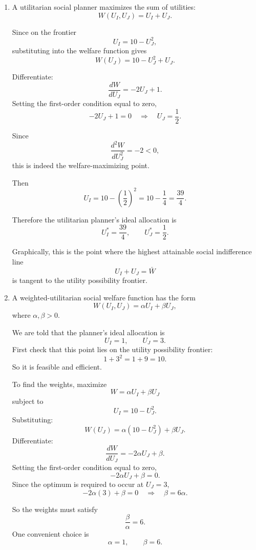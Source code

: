 \documentclass[12pt]{article}
\begin{document}
\begin{enumerate}[label=(\alph*)]
    The feasible utility set is the region on and below this frontier:
    \[
    U_I + U_J^2 \le 10.
    \]

    \item
    A utilitarian social planner maximizes the sum of utilities:
    \[
    W(U_I,U_J)=U_I+U_J.
    \]

    Since on the frontier
    \[
    U_I=10-U_J^2,
    \]
    substituting into the welfare function gives
    \[
    W(U_J)=10-U_J^2+U_J.
    \]

    Differentiate:
    \[
    \frac{dW}{dU_J}=-2U_J+1.
    \]
    Setting the first-order condition equal to zero,
    \[
    -2U_J+1=0
    \quad\Longrightarrow\quad
    U_J=\frac12.
    \]

    Since
    \[
    \frac{d^2W}{dU_J^2}=-2<0,
    \]
    this is indeed the welfare-maximizing point.

    Then
    \[
    U_I=10-\left(\frac12\right)^2
    =10-\frac14
    =\frac{39}{4}.
    \]

    Therefore the utilitarian planner's ideal allocation is
    \[
    \boxed{
    U_I^*=\frac{39}{4},
    \qquad
    U_J^*=\frac12.}
    \]

    Graphically, this is the point where the highest attainable social indifference line
    \[
    U_I+U_J=\bar W
    \]
    is tangent to the utility possibility frontier.

    \item
    A weighted-utilitarian social welfare function has the form
    \[
    W(U_I,U_J)=\alpha U_I+\beta U_J,
    \]
    where \(\alpha,\beta>0\).

    We are told that the planner's ideal allocation is
    \[
    U_I=1,\qquad U_J=3.
    \]
    First check that this point lies on the utility possibility frontier:
    \[
    1+3^2=1+9=10.
    \]
    So it is feasible and efficient.

    To find the weights, maximize
    \[
    W=\alpha U_I+\beta U_J
    \]
    subject to
    \[
    U_I=10-U_J^2.
    \]
    Substituting:
    \[
    W(U_J)=\alpha(10-U_J^2)+\beta U_J.
    \]
    Differentiate:
    \[
    \frac{dW}{dU_J}=-2\alpha U_J+\beta.
    \]
    Setting the first-order condition equal to zero,
    \[
    -2\alpha U_J+\beta=0.
    \]
    Since the optimum is required to occur at \(U_J=3\),
    \[
    -2\alpha(3)+\beta=0
    \quad\Longrightarrow\quad
    \beta=6\alpha.
    \]

    So the weights must satisfy
    \[
    \frac{\beta}{\alpha}=6.
    \]
    One convenient choice is
    \[
    \alpha=1,\qquad \beta=6.
    \]


\end{enumerate}
\end{document}
